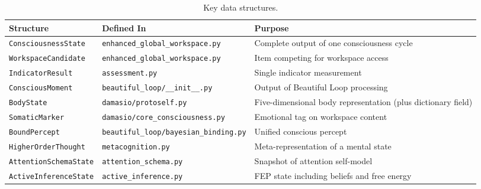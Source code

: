 \begin{table}[ht]
\centering
\small
\begin{tabular}{@{}lp{5.5cm}p{5.5cm}@{}}
\toprule
\textbf{Structure} & \textbf{Defined In} & \textbf{Purpose} \\
\midrule
\texttt{ConsciousnessState}    & \texttt{enhanced\_global\_workspace.py}      & Complete output of one consciousness cycle \\
\texttt{WorkspaceCandidate}    & \texttt{enhanced\_global\_workspace.py}      & Item competing for workspace access \\
\texttt{IndicatorResult}       & \texttt{assessment.py}                       & Single indicator measurement \\
\texttt{ConsciousMoment}       & \texttt{beautiful\_loop/\_\_init\_\_.py}     & Output of Beautiful Loop processing \\
\texttt{BodyState}             & \texttt{damasio/protoself.py}                & Five-dimensional body representation (plus dictionary field) \\
\texttt{SomaticMarker}         & \texttt{damasio/core\_consciousness.py}      & Emotional tag on workspace content \\
\texttt{BoundPercept}          & \texttt{beautiful\_loop/bayesian\_binding.py} & Unified conscious percept \\
\texttt{HigherOrderThought}    & \texttt{metacognition.py}                    & Meta-representation of a mental state \\
\texttt{AttentionSchemaState}  & \texttt{attention\_schema.py}                & Snapshot of attention self-model \\
\texttt{ActiveInferenceState}  & \texttt{active\_inference.py}                & FEP state including beliefs and free energy \\
\bottomrule
\end{tabular}
\caption{Key data structures.}
\label{tab:data-structures}
\end{table}
